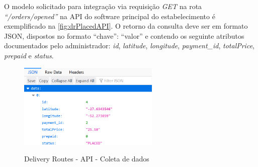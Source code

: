 O modelo solicitado para integração via requisição \textit{GET} na rota \textit{“/orders/opened”} na API do software principal do estabelecimento é exemplificado na \autoref{fig:drPlacedAPI}. O retorno da consulta deve ser em formato JSON, dispostos no formato “chave”: “valor” e contendo os seguinte atributos documentados pelo administrador: \textit{id}, \textit{latitude}, \textit{longitude}, \textit{payment\_id}, \textit{totalPrice}, \textit{prepaid} e \textit{status}.

\begin{figure}[H]
    \centering
    \caption{Delivery Routes - API - Coleta de dados}
    \includegraphics[width=0.6\textwidth]{./dados/figuras/fig14}
    \label{fig:drPlacedAPI}
\end{figure}